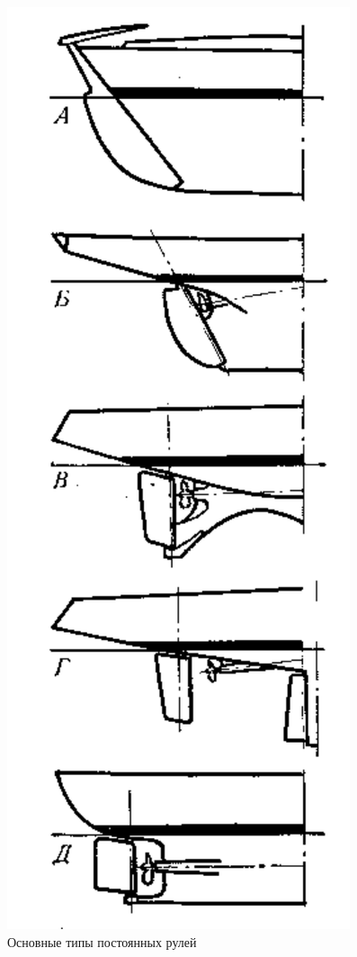 \documentclass[a4paper, 12pt, twoside, final]{scrbook}
\begin{document}
\begin{figure}%
\begin{centering}
\includegraphics{pics/Postoyannye_ruli}
\par\end{centering}

\protect\caption{\label{fig:30}Основные типы постоянных рулей}


\end{figure}%
\end{document}
